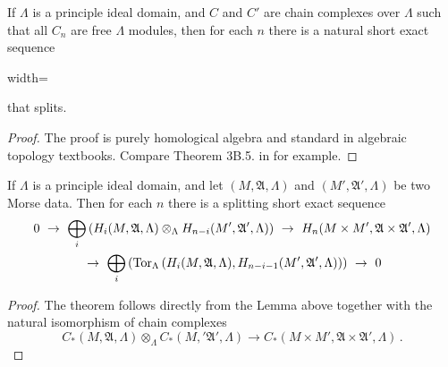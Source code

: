 	
\begin{lemma}
	If $\Lambda$ is a principle ideal domain, and $C$ and $C'$ are chain complexes over $\Lambda$ such that all $C_n$ are free $\Lambda$ modules, then for each $n$ there is a natural short exact sequence 
	\begin{center}
		\begin{adjustbox}{width=\textwidth}
		\end{adjustbox}
	\end{center}that splits.
\end{lemma}
\begin{proof}
	The proof is purely homological algebra and standard in algebraic topology textbooks. Compare Theorem 3B.5. in  \cite{hatcher2002algebraic} for example.
\end{proof}
\begin{theorem}
	If $\Lambda$ is a principle ideal domain, and let $(M,\mathfrak{A},\Lambda)$ and $(M',\mathfrak{A}',\Lambda)$ be two Morse data. Then for each $n$ there is a splitting short exact sequence 
	\begin{multline*}
		0~\to ~
		\bigoplus_i\left(H_i(M,\mathfrak{A},\Lambda)\otimes_\Lambda H_{n-i}(M',\mathfrak{A}',\Lambda)\right) ~\to~
			H_n(M\times M',\mathfrak{A}\times \mathfrak{A}',\Lambda) \\
		~	\to ~
			\bigoplus_i\left(\operatorname{\mathrm{Tor}}_{\Lambda}\left(
			H_i(M,\mathfrak{A},\Lambda),H_{n-i-1}(M',\mathfrak{A}',\Lambda)
			\right) \right)~ \to ~0
	\end{multline*}
\end{theorem}
\begin{proof}
	The theorem follows directly from the Lemma above together with the natural isomorphism of chain complexes 
	\begin{equation*}
		C_*(M,\mathfrak{A},\Lambda)\otimes_\Lambda C_*(M,'\mathfrak{A}',\Lambda) \to C_*(M\times M',\mathfrak{A}\times \mathfrak{A}',\Lambda) \,.
	\end{equation*}
\end{proof}









